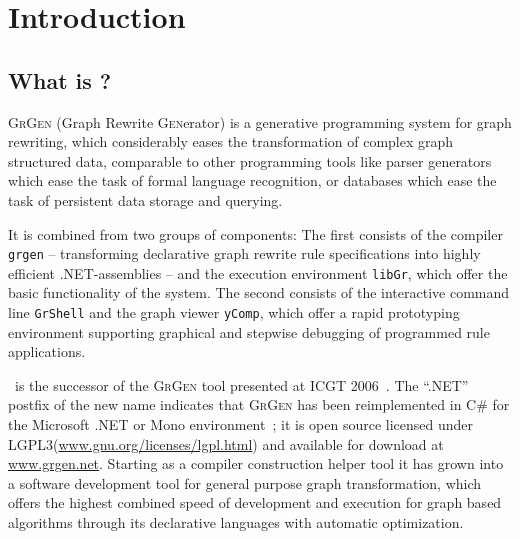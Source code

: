 \chapter{Introduction}
\label{chp:intro}


\section{What is \GrG?}

{\scshape GrGen} (\textsc{G}raph \textsc{R}ewrite \textsc{Gen}erator) is a generative programming system for graph rewriting,
which considerably eases the transformation of complex graph structured data,
comparable to other programming tools like parser generators which ease the task of formal language recognition,
or databases which ease the task of persistent data storage and querying.

It is combined from two groups of components:
The first consists of the compiler \texttt{grgen} -- transforming declarative graph rewrite rule specifications into highly efficient .NET-assemblies --
and the execution environment \texttt{libGr}, which offer the basic functionality of the system.
The second consists of the interactive command line \texttt{GrShell} and the graph viewer \texttt{yComp},
which offer a rapid prototyping environment supporting graphical and stepwise debugging of programmed rule applications.

\GrG~is the successor of the \textsc{GrGen} tool presented at ICGT 2006~\cite{GBGHS:06}.
The ``.NET'' postfix of the new name indicates that \textsc{GrGen} has been reimplemented in C\# for the Microsoft .NET or Mono environment~\cite{NET,MONO};
it is open source licensed under LGPL3(\url{www.gnu.org/licenses/lgpl.html}) and available for download at \url{www.grgen.net}.
Starting as a compiler construction helper tool it has grown into a software development tool for general purpose graph transformation,
which offers the highest combined speed of development and execution for graph based algorithms through its declarative languages with automatic optimization.


